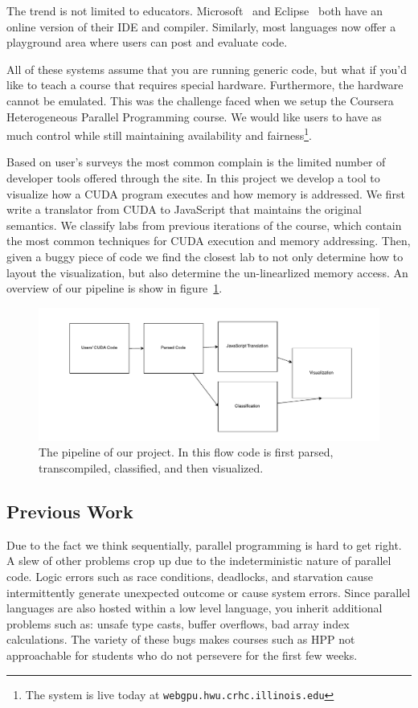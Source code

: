 \documentclass[nocopyrightspace]{sigchi}
\begin{document}
The trend is not limited to educators. Microsoft~\cite{1_visualstudio.com_2014} and Eclipse~\cite{orion} both have an online
version of their IDE and compiler. Similarly, most languages now offer a playground area
where users can post and evaluate code.

All of these systems assume that you are running generic code, but what if you'd like
to teach a course that requires special hardware. Furthermore, the hardware cannot be
emulated. This was the challenge faced when we setup the Coursera Heterogeneous Parallel
Programming course. We would like users to have as much control while still maintaining
availability and fairness\footnote{The system is live today at {\tt webgpu.hwu.crhc.illinois.edu}}. 

Based on user's surveys the most common complain is the limited number of developer tools
offered through the site. In this project we develop a tool to visualize how a CUDA
program executes and how memory is addressed. We first write a translator from 
CUDA to JavaScript that maintains the original semantics.
We classify labs from previous iterations of the course, which contain the most
common techniques for CUDA execution and 
memory addressing. Then, given a buggy piece of code we find the closest lab to 
not only determine how to layout the visualization, but also determine the 
un-linearlized memory access.
An overview of our pipeline is show in figure~\ref{fig:pipeline}.

\begin{figure}[!h]
\centering
\includegraphics[width=0.9\columnwidth]{flow}
\caption{The pipeline of our project. In this flow code is first
parsed, transcompiled, classified, and then visualized.}
\label{fig:pipeline}
\end{figure}

\subsection{Previous Work}


Due to the fact we think sequentially, parallel programming is hard to get
right. A slew of other problems crop up due to the  indeterministic nature of
parallel code. Logic errors such as race conditions, deadlocks, and starvation
cause intermittently generate unexpected outcome or cause system errors.
Since parallel languages are also hosted within a low level language,
you inherit additional problems such as: unsafe type casts, buffer overflows,
bad array index calculations. The variety of these bugs makes courses such 
as HPP not approachable for students who do not persevere for the first few 
weeks.
\end{document}

